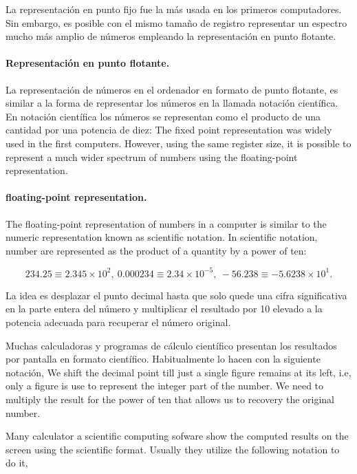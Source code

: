 \begin{paracol}{2}
La representación en punto fijo fue la más usada en los primeros computadores. Sin embargo, es posible con el mismo tamaño de registro representar un espectro mucho más amplio de números empleando la representación en punto flotante.

\paragraph*{Representación en punto flotante.} 
La representación de números en el ordenador en formato de punto flotante, es similar a la forma de representar los números en la llamada notación científica.  En notación científica los números se representan como el producto de una cantidad por una potencia de diez:
\switchcolumn
The fixed point representation was widely used in the first computers. However, using the same register size, it is possible to represent a much wider spectrum of numbers using the floating-point representation.

\paragraph{floating-point representation.} 
The floating-point representation of numbers in a computer is similar to the numeric representation known as scientific notation. In scientific notation, number are represented as the product of a quantity by a power of ten:
\end{paracol}
\begin{equation*}
234.25\equiv 2.345\times 10^2,\ 0.000234\equiv 2.34\times 10^{-5},\ -56.238 \equiv -5.6238\times 10^1.    
\end{equation*}

\begin{paracol}{2}
La idea es desplazar el punto decimal hasta que solo quede una cifra significativa en la parte entera del número y multiplicar el resultado por 10 elevado a la potencia adecuada para recuperar el número original.

Muchas calculadoras y programas de cálculo científico presentan los resultados por pantalla en formato científico. Habitualmente lo hacen con la siguiente notación,
\switchcolumn
We shift the decimal point till just a single figure remains at its left, i.e, only a figure is use to represent the integer part of the number. We need to multiply the result for the power of ten that allows us to recovery the original number.

Many calculator a scientific computing sofware show the computed results on the screen using the scientific format. Usually they utilize the following notation to do it,    

\end{paracol}

